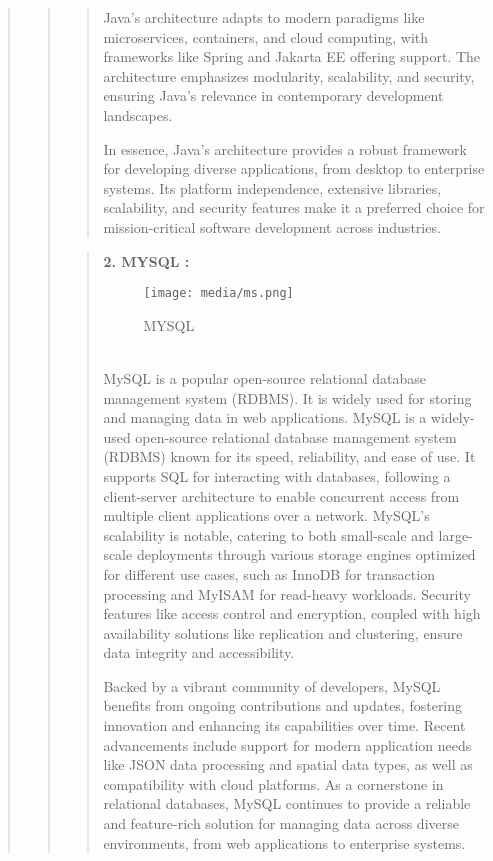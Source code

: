 \documentclass[12pt]{report}
\begin{document}
\begin{quote}
\begin{quote}
\begin{quote}
			Java's architecture adapts to modern paradigms like microservices, containers, and cloud computing, with frameworks like Spring and Jakarta EE offering support. The architecture emphasizes modularity, scalability, and security, ensuring Java's relevance in contemporary development landscapes.
			
			In essence, Java's architecture provides a robust framework for developing diverse applications, from desktop to enterprise systems. Its platform independence, extensive libraries, scalability, and security features make it a preferred choice for mission-critical software development across industries.
			
			
		\end{quote}
		
		\begin{quote}
			\textbf{2. MYSQL :}
			\begin{figure}[h]
				\centering
				\texttt{[image: media/ms.png]}\\
				\caption{MYSQL}
				
			\end{figure}
			\\MySQL is a popular open-source relational database management system (RDBMS). It is widely used for storing and managing data in web applications.
			MySQL is a widely-used open-source relational database management system (RDBMS) known for its speed, reliability, and ease of use. It supports SQL for interacting with databases, following a client-server architecture to enable concurrent access from multiple client applications over a network. MySQL's scalability is notable, catering to both small-scale and large-scale deployments through various storage engines optimized for different use cases, such as InnoDB for transaction processing and MyISAM for read-heavy workloads. Security features like access control and encryption, coupled with high availability solutions like replication and clustering, ensure data integrity and accessibility.
			
			Backed by a vibrant community of developers, MySQL benefits from ongoing contributions and updates, fostering innovation and enhancing its capabilities over time. Recent advancements include support for modern application needs like JSON data processing and spatial data types, as well as compatibility with cloud platforms. As a cornerstone in relational databases, MySQL continues to provide a reliable and feature-rich solution for managing data across diverse environments, from web applications to enterprise systems.
		\end{quote}
		

\end{quote}
\end{quote}
\end{document}

